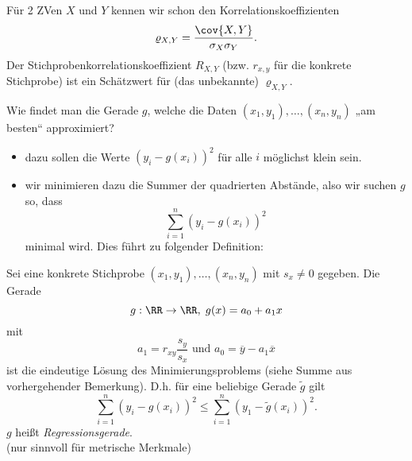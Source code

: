  Für 2 ZVen $X$ und $Y$ kennen wir schon den Korrelationskoeffizienten
$$\varrho_{X,Y}=\frac{\cov{X,Y}}{\sigma_X \sigma_Y}\text{.}$$
Der Stichprobenkorrelationskoeffizient $R_{X,Y}$ (bzw. $r_{x,y}$ für die konkrete Stichprobe) ist ein Schätzwert für (das unbekannte) $\varrho_{X,Y}$.\bigskip

Wie findet man die Gerade $g$, welche die Daten $(x_1,y_1), \ldots, (x_n, y_n)$ „am besten“ approximiert?
\begin{itemize}
\item dazu sollen die Werte $(y_i-g(x_i))^2$ für alle $i$ möglichst klein sein.\\
\item wir minimieren dazu die Summer der quadrierten Abstände, also wir suchen $g$ so, dass 
$$\sum_{i=1}^n (y_i-g(x_i))^2$$
minimal wird. Dies führt zu folgender Definition:
\end{itemize}
 Sei eine konkrete Stichprobe $(x_1,y_1),\ldots, (x_n,y_n)$ mit $s_x\not = 0$ gegeben. Die Gerade 
$$g: \RR\to \RR, \; g(x)=a_0+a_1x$$
mit
$$a_1 = r_{xy}\frac{s_y}{s_x} \text{ und } a_0 = \overline{y} - a_1 \overline{x}$$
ist die eindeutige Lösung des Minimierungsproblems (siehe Summe aus vorhergehender Bemerkung). D.h. für eine beliebige Gerade $\tilde{g}$ gilt
$$\sum_{i=1}^n (y_i - g(x_i))^2 \leq \sum_{i=1}^n(y_1 - \tilde{g}(x_i))^2 \text{.}$$
$g$ heißt \emph{Regressionsgerade}.\\
(nur sinnvoll für metrische Merkmale)

